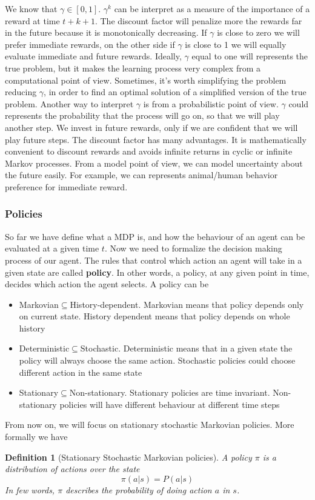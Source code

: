 \documentclass[main.tex]{subfiles}
\newtheorem{definition}{Definition}[section]
\begin{document}
We know that $\gamma \in [0,1]$. $\gamma^k$ can be interpret as a measure of the importance of a reward at time $t+k+1$. The discount factor will penalize more the rewards far in the future because it is monotonically decreasing. If $\gamma$ is close to zero we will prefer immediate rewards, on the other side if $\gamma$ is close to 1 we will equally evaluate immediate and future rewards. Ideally, $\gamma$ equal to one will represents the true problem, but it makes the learning process very complex from a computational point of view. Sometimes, it's worth simplifying the problem reducing $\gamma$, in order to find an optimal solution of a simplified version of the true problem. Another way to interpret $\gamma$ is from a probabilistic point of view. $\gamma$ could represents the probability that the process will go on, so that we will play another step. We invest in future rewards, only if we are confident that we will play future steps. The discount factor has many advantages. It is mathematically convenient to discount rewards and avoids infinite returns in cyclic or infinite Markov processes. From a model point of view, we can model uncertainty about the future easily. For example, we can represents animal/human behavior preference for immediate reward.

\subsubsection{Policies} So far we have define what a MDP is, and how the behaviour of an agent can be evaluated at a given time $t$. Now we need to formalize the decision making process of our agent. The rules that control which action an agent will take in a given state are called \textbf{policy}. In other words, a policy, at any given point in time, decides which action the agent selects. A policy can be
\begin{itemize}
    \item Markovian$\subseteq$History-dependent. Markovian means that policy depends only on current state. History dependent means that policy depends on whole history
    \item Deterministic$\subseteq$Stochastic. Deterministic means that in a given state the policy will always choose the same action. Stochastic policies could choose different action in the same state
    \item Stationary$\subseteq$Non-stationary. Stationary policies are time invariant. Non-stationary policies will have different behaviour at different time steps
\end{itemize}
From now on, we will focus on stationary stochastic Markovian policies. More formally we have
\begin{definition}[Stationary Stochastic Markovian policies]
A policy $\pi$ is a distribution of actions over the state
\begin{equation*}
    \pi(a|s) = P(a|s)
\end{equation*}
In few words, $\pi$ describes the probability of doing action $a$ in $s$.
\end{definition}
\end{document}
